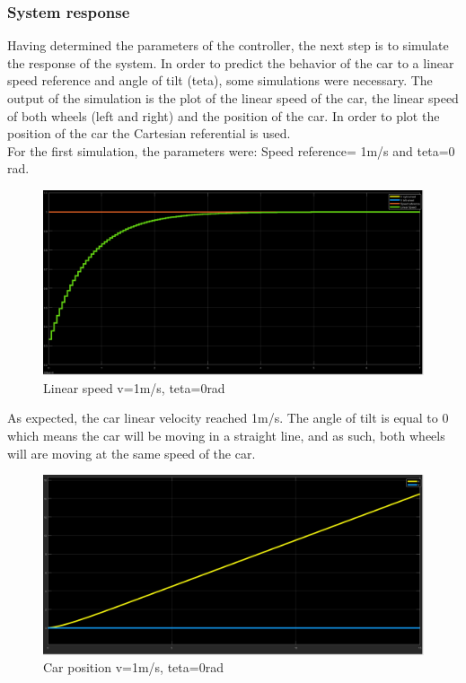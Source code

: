 \subsubsection{System response}
Having determined the parameters of the controller, the next step is to simulate the response of the system.
In order to predict the behavior of the car to a linear speed reference and angle of tilt (teta), some simulations were necessary. The output of the simulation is the plot of the linear speed of the car, the linear speed of both wheels (left and right) and the position of the car.
In order to plot the position of the car the Cartesian referential is used.\\
For the first simulation, the parameters were: Speed reference= 1m/s and teta=0 rad.\\
\begin{figure}[!h]
\centering
\includegraphics[width=1.0\textwidth]{./img/vel10.png}
\caption {\label{fig:sim1 - vel}Linear speed v=1m/s, teta=0rad}
\end{figure}
 As expected, the car linear velocity reached 1m/s. The angle of tilt is equal to 0 which means the car will be moving in a straight line, and as such, both wheels will are moving at the same speed of the car.\\
\newpage
\begin{figure}[!h]
\centering
\includegraphics[width=1.0\textwidth]{./img/xy10.png}
\caption {\label{fig:sim1 - pos}Car position v=1m/s, teta=0rad}
\end{figure}
